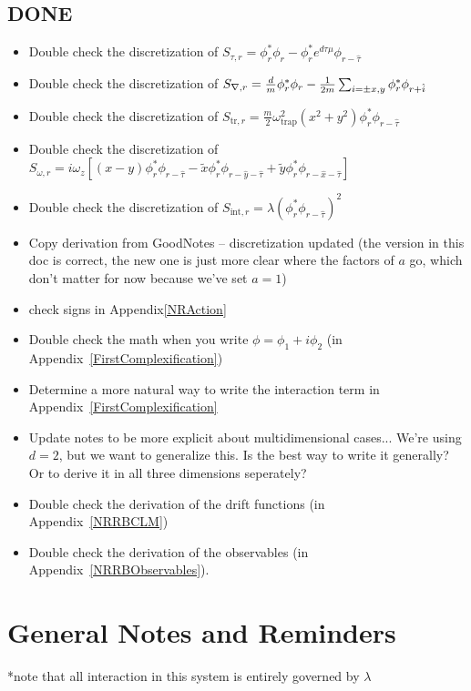 \documentclass[../RotatingBosons.tex]{subfiles}
\begin{document}
\subsection{DONE}
\begin{itemize}
	\item Double check the discretization of $S_{\tau, r}  =  \phi^{*}_{r}\phi_{r}- \phi^{*}_{r}e^{d \tau \mu} \phi_{r - \hat{\tau}} $
	\item Double check the discretization of $S_{{\nabla}, r}  =  \frac{d}{m} \phi^{*}_{r}\phi_{r} - \frac{1}{2m}\sum_{i = \pm x,y} \phi^{*}_{r}\phi_{r+\hat{i}}$
	\item Double check the discretization of $S_{\mathrm{tr},r} = \frac{m}{2}\omega_{\text{trap}}^{2}(x^{2}+y^{2})\phi_{r}^{*}\phi_{r-\hat{\tau}}$
	\item Double check the discretization of $S_{\omega, r} =  i \omega_{z} \left[ (x-y)\phi_{r}^{*}  \phi_{r-\hat{\tau}} - \widetilde{x} \phi_{r}^{*} \phi_{r-\hat{y}-\hat{\tau}} + \widetilde{y} \phi_{r}^{*}  \phi_{r-\hat{x}-\hat{\tau}} \right] $
	\item Double check the discretization of $S_{\text{int}, r} = \lambda \left(\phi_{r}^{*} \phi_{r-\hat{\tau}}\right)^{2}$	
	\item Copy derivation from GoodNotes -- discretization updated (the version in this doc is correct, the new one is just more clear where the factors of $a$ go, which don't matter for now because we've set $a = 1$)
	\item check signs in Appendix\ref{NRAction}
	\item Double check the math when you write $\phi = \phi_{1} + i\phi_{2}$ (in Appendix~\ref{FirstComplexification})
	\item Determine a more natural way to write the interaction term in Appendix~\ref{FirstComplexification}
	\item Update notes to be more explicit about multidimensional cases... We're using $d=2$, but we want to generalize this. Is the best way to write it generally? Or to derive it in all three dimensions seperately?
	\item Double check the derivation of the drift functions (in Appendix~\ref{NRRBCLM}) 
	\item Double check the derivation of the observables (in Appendix~\ref{NRRBObservables}).
\end{itemize}

\section{General Notes and Reminders}
*note that all interaction in this system is entirely governed by $\lambda$
\end{document}
